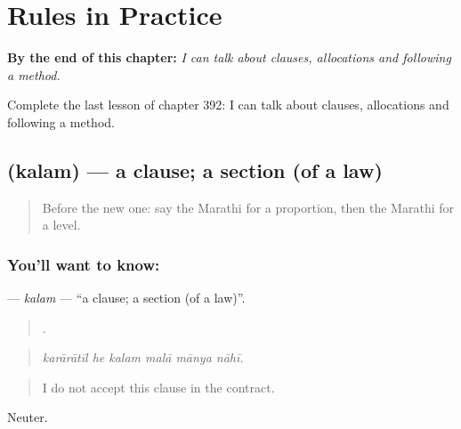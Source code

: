 
\chapter{Rules in Practice}
\label{ch:mr-rules-in-practice}

\begin{chapteropening}
\textbf{By the end of this chapter:} \emph{I can talk about clauses, allocations and following a method.}

Complete the last lesson of chapter 392: I can talk about clauses, allocations and following a method.
\end{chapteropening}

\section[\texorpdfstring{\mr{कलम} (kalam)}{कलम (kalam)}]{ (kalam) — a clause; a section (of a law)}

\label{lesson:MR-C392-kalam}



\begin{quote}
Before the new one: say the Marathi for a proportion, then the Marathi for a level.
\end{quote}

\subsection*{You'll want to know: }
\textbf{} — \emph{kalam} — \textquotedblleft{}a clause; a section (of a law)\textquotedblright{}.

\begin{quote}
     .
\end{quote}

\begin{quote}
\emph{karārātīl he kalam malā mānya nāhī.}
\end{quote}

\begin{quote}
I do not accept this clause in the contract.
\end{quote}

Neuter.

